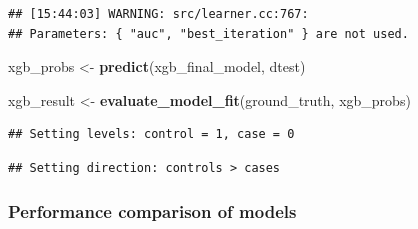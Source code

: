 \documentclass[
]{article}
\newenvironment{Shaded}{\begin{snugshade}}{\end{snugshade}}
\newcommand{\AttributeTok}[1]{\textcolor[rgb]{0.13,0.29,0.53}{#1}}
\newcommand{\DecValTok}[1]{\textcolor[rgb]{0.00,0.00,0.81}{#1}}
\newcommand{\DocumentationTok}[1]{\textcolor[rgb]{0.56,0.35,0.01}{\textbf{\textit{#1}}}}
\newcommand{\FunctionTok}[1]{\textcolor[rgb]{0.13,0.29,0.53}{\textbf{#1}}}
\newcommand{\NormalTok}[1]{#1}
\newcommand{\OtherTok}[1]{\textcolor[rgb]{0.56,0.35,0.01}{#1}}
\newcommand{\SpecialCharTok}[1]{\textcolor[rgb]{0.81,0.36,0.00}{\textbf{#1}}}
\begin{document}
\begin{Shaded}
\end{Shaded}

\begin{verbatim}
## [15:44:03] WARNING: src/learner.cc:767: 
## Parameters: { "auc", "best_iteration" } are not used.
\end{verbatim}

\begin{Shaded}
\begin{Highlighting}[]
\NormalTok{xgb\_probs }\OtherTok{\textless{}{-}} \FunctionTok{predict}\NormalTok{(xgb\_final\_model, dtest)}

\NormalTok{xgb\_result }\OtherTok{\textless{}{-}} \FunctionTok{evaluate\_model\_fit}\NormalTok{(ground\_truth, xgb\_probs)}
\end{Highlighting}
\end{Shaded}

\begin{verbatim}
## Setting levels: control = 1, case = 0
\end{verbatim}

\begin{verbatim}
## Setting direction: controls > cases
\end{verbatim}

\subsubsection{\texorpdfstring{\textbf{Performance comparison of
models}}{Performance comparison of models}}\label{performance-comparison-of-models}
\end{document}
